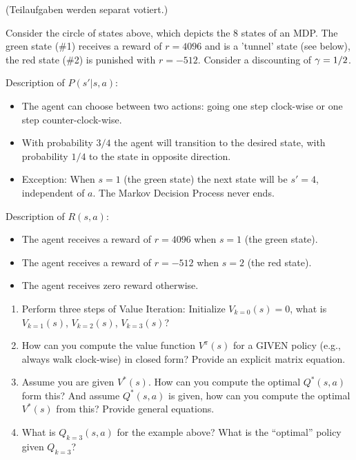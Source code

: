 

\renewcommand{\course}{Artificial Intelligence}
\renewcommand{\coursepicture}{course_ai}
\renewcommand{\coursedate}{Winter 2019}
\renewcommand{\exnum}{3}

\exercises
{}
\exercisestitle



(Teilaufgaben werden separat votiert.)


Consider the circle of states above, which depicts the 8 states of an
MDP. The green state (\#1) receives a reward of $r=4096$ and is a 'tunnel'
state (see below), the red state (\#2) is punished with
$r=-512$. Consider a discounting of $\gamma=1/2$.

Description of $P(s'|s,a)$:\NewParNoBreak
\begin{itemize}
\item The agent can choose between two actions: going one step clock-wise or one
  step counter-clock-wise.
\item With probability $3/4$ the agent will transition to the desired state,
  with probability $1/4$ to the state in opposite direction.
\item Exception: When $s=1$ (the green state) the next state will be
$s'=4$, independent of $a$. The Markov Decision Process never ends.
\end{itemize}

Description of $R(s,a)$:\NewParNoBreak
\begin{itemize}
\item The agent receives a reward of $r=4096$ when $s=1$ (the green state).
\item The agent receives a reward of $r=-512$ when $s=2$ (the red
state).
\item The agent receives zero reward otherwise.
\end{itemize}

\begin{enumerate}
\item Perform three steps of Value Iteration: Initialize $V_{k=0}(s)=0$, what is
  $V_{k=1}(s)$, $V_{k=2}(s)$, $V_{k=3}(s)$?
\item How can you compute the value function $V^\pi(s)$ for
a GIVEN policy (e.g., always walk clock-wise) in closed form? Provide
an explicit matrix equation.
\item Assume you are given $V^*(s)$. How can you compute the optimal $Q^*(s,a)$
  form this? And assume $Q^*(s,a)$ is given, how can you compute the optimal
  $V^*(s)$ from this? Provide general equations.
\item What is $Q_{k=3}(s,a)$ for the example above? What is the
  ``optimal'' policy given $Q_{k=3}$?
\end{enumerate}

